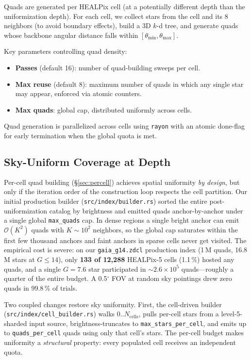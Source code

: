 \documentclass[twocolumn, 10pt]{article}
\newcommand{\degr}{\ensuremath{^{\circ}}}
\begin{document}
Quads are generated per HEALPix cell (at a potentially different depth
than the uniformization depth). For each cell, we collect stars from the
cell and its 8 neighbors (to avoid boundary effects), build a 3D $k$-d
tree, and generate quads whose backbone angular distance falls within
$[\theta_{\min}, \theta_{\max}]$.

Key parameters controlling quad density:
\begin{itemize}
    \item \textbf{Passes} (default 16): number of quad-building sweeps
          per cell.
    \item \textbf{Max reuse} (default 8): maximum number of quads in
          which any single star may appear, enforced via atomic counters.
    \item \textbf{Max quads}: global cap, distributed uniformly across
          cells.
\end{itemize}

Quad generation is parallelized across cells using \texttt{rayon} with
an atomic done-flag for early termination when the global quota is met.

\subsection{Sky-Uniform Coverage at Depth} \label{sec:uniform}

Per-cell quad building (\S\ref{sec:percell}) achieves spatial uniformity
\emph{by design}, but only if the iteration order of the construction
loop respects the cell partition. Our initial production builder
(\texttt{src/index/builder.rs}) sorted the entire post-uniformization
catalog by brightness and emitted quads anchor-by-anchor under a single
global \texttt{max\_quads} cap. In dense regions a single bright anchor
can emit $\mathcal{O}(K^2)$ quads with $K \sim 10^2$ neighbors, so the
global cap saturates within the first few thousand anchors and faint
anchors in sparse cells never get visited. The empirical cost is severe:
on our \texttt{gaia\_g14.zdcl} production index (1\,M quads, 16.8\,M
stars at $G \le 14$), only \textbf{133 of 12{,}288} HEALPix-5 cells
(1.1\,\%) hosted any quads, and a single $G = 7.6$ star participated in
$\sim 2.6 \times 10^5$ quads---roughly a quarter of the entire budget.
A 0.5\degr{} FOV at random sky pointings drew zero quads in 99.8\,\% of
trials.

Two coupled changes restore sky uniformity. First, the cell-driven
builder (\texttt{src/index/cell\_builder.rs}) walks
$0..N_{\text{cells}}$, pulls per-cell stars from a level-5-sharded
input source, brightness-truncates to \texttt{max\_stars\_per\_cell},
and emits up to \texttt{quads\_per\_cell} quads using only that cell's
stars. The per-cell budget makes uniformity a \emph{structural}
property: every populated cell receives an independent quota.
\end{document}
